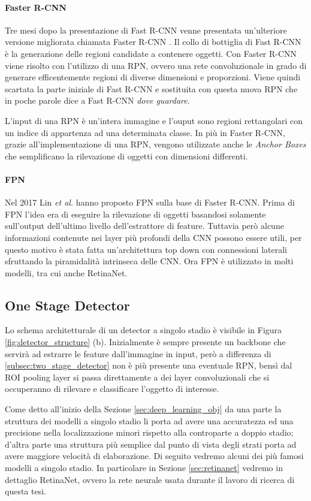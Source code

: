 \paragraph{Faster R-CNN}
Tre mesi dopo la presentazione di Fast R-CNN venne presentata un'ulteriore versione migliorata chiamata Faster R-CNN \cite{ren2015faster}. Il collo di bottiglia di Fast R-CNN è la generazione delle regioni candidate a contenere oggetti. Con Faster R-CNN viene risolto con l'utilizzo di una \ac{RPN}, ovvero una rete convoluzionale in grado di generare efficentemente regioni di diverse dimensioni e proporzioni. Viene quindi scartata la parte iniziale di Fast R-CNN e sostituita con questa nuova \ac{RPN} che in poche parole dice a Fast R-CNN \textit{dove guardare}.

L'input di una \ac{RPN} è un'intera immagine e l'ouput sono regioni rettangolari con un indice di appartenza ad una determinata classe. 
In più in Faster R-CNN, grazie all'implementazione di una \ac{RPN}, vengono utilizzate anche le \textit{Anchor Boxes} che semplificano la rilevazione di oggetti con dimensioni differenti. 
\paragraph{FPN}
Nel 2017 Lin \textit{et al.} hanno proposto \ac{FPN} \cite{lin2017feature} sulla base di Faster R-CNN. Prima di \ac{FPN} l'idea era di eseguire la rilevazione di oggetti basandosi solamente sull'output dell'ultimo livello dell'estrattore di feature. Tuttavia però alcune informazioni contenute nei layer più profondi della \ac{CNN} possono essere utili, per questo motivo è stata fatta un'architettura top down con connessioni laterali sfruttando la piramidalità intrinseca delle \ac{CNN}. Ora \ac{FPN} è utilizzato in molti modelli, tra cui anche RetinaNet. 
\subsection{One Stage Detector}
\label{subsec:one_stage_detector}
Lo schema architetturale di un detector a singolo stadio è visibile in Figura \ref{fig:detector_structure} (b). Inizialmente è sempre presente un backbone che servirà ad estrarre le feature dall'immagine in input, però a differenza di \ref{subsec:two_stage_detector} non è più presente una eventuale \ac{RPN}, bensì dal \ac{ROI} pooling layer si passa direttamente a dei layer convoluzionali che si occuperanno di rilevare e classificare l'oggetto di interesse. 

Come detto all'inizio della Sezione \ref{sec:deep_learning_obj} da una parte la struttura dei modelli a singolo stadio li porta ad avere una accuratezza ed una precisione nella localizzazione minori rispetto alla controparte a doppio stadio; d'altra parte una struttura più semplice dal punto di vista degli strati porta ad avere maggiore velocità di elaborazione. Di seguito vedremo alcuni dei più famosi modelli a singolo stadio. In particolare in Sezione \ref{sec:retinanet} vedremo in dettaglio RetinaNet, ovvero la rete neurale usata durante il lavoro di ricerca di questa tesi.


